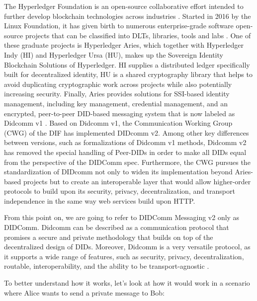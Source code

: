 The Hyperledger Foundation is an open-source collaborative effort intended to further develop blockchain technologies across industries \cite{jones_boswell_2022}. Started in 2016 by the Linux Foundation, it has given birth to numerous enterprise-grade software open-source projects that can be classified into DLTs, libraries, tools and labs \cite{lusard_lehors_muscara_boswell_zsigri_2021}. One of these graduate projects is Hyperledger Aries, which together with Hyperledger Indy (HI) and Hyperledger Ursa (HU), makes up the Sovereign Identity Blockchain Solutions of Hyperledger. HI supplies a distributed ledger specifically built for decentralized identity, HU is a shared cryptography library that helps to avoid duplicating cryptographic work across projects while also potentially increasing security. Finally, Aries provides solutions for SSI-based identity management, including key management, credential management, and an encrypted, peer-to-peer DID-based messaging system that is now labeled as Didcomm v1 \cite{jones_boswell_2022}. 
Based on Didcomm v1, the Communication Working Group (CWG) of the DIF has implemented DIDcomm v2. Among other key differences between versions, such as formalizations of Didcomm v1 methods, Didcomm v2 has removed the special handling of Peer-DIDs in order to make all DIDs equal from the perspective of the DIDComm spec. Furthermore, the CWG pursues the standardization of DIDcomm not only to widen its implementation beyond Aries-based projects but to create an interoperable layer that would allow higher-order protocols to build upon its security, privacy, decentralization, and transport independence in the same way web services build upon HTTP. \cite{young_2020} \cite{curren_looker_terbu_2020}

From this point on, we are going to refer to DIDComm Messaging v2 only as DIDComm. Didcomm can be described as a communication protocol that promises a secure and private methodology that builds on top of the decentralized design of DIDs. Moreover, Didcomm is a very versatile protocol, as it supports a wide range of features, such as security, privacy, decentralization, routable, interoperability, and the ability to be transport-agnostic \cite{curren_looker_terbu_2020}.

To better understand how it works, let's look at how it would work in a scenario where Alice wants to send a private message to Bob: 



